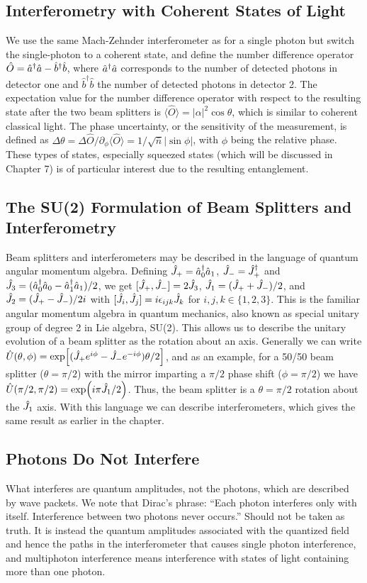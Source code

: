 \subsection{Interferometry with Coherent States of Light}
We use the same Mach-Zehnder interferometer as for a single photon but switch the single-photon to a coherent state, and define the number difference operator $\hat{O} = \hat{a}^\dagger \hat{a} - \hat{b}^\dagger \hat{b}$, where $\hat{a}^\dagger \hat{a}$ corresponds to the number of detected photons in detector one and $\hat{b}^\dagger \hat{b}$ the number of detected photons in detector 2. The expectation value for the number difference operator with respect to the resulting state after the two beam splitters is $\langle \hat{O} \rangle = |\alpha|^2\cos\theta$, which is similar to coherent classical light. The phase uncertainty, or the sensitivity of the measurement, is defined as $\Delta \theta = \Delta \hat{O} / \partial_\phi \langle\hat{O}\rangle = 1 /\sqrt{\bar{n}}|\sin\phi|$, with $\phi$ being the relative phase. These types of states, especially squeezed states (which will be discussed in Chapter 7) is of particular interest due to the resulting entanglement.

\subsection{The SU(2) Formulation of Beam Splitters and Interferometry}
Beam splitters and interferometers may be described in the language of quantum angular momentum algebra. Defining $\hat{J}_+ = \hat{a}^\dagger_0 \hat{a}_1$, $\hat{J}_- = \hat{J}^\dagger_+$ and $\hat{J}_3 = (\hat{a}^\dagger_0\hat{a}_0 - \hat{a}^\dagger_1\hat{a}_1)/2$, we get $[\hat{J}_+,\hat{J}_-] = 2\hat{J}_3$, $\hat{J}_1 = (\hat{J}_+ + \hat{J}_-)/2$, and $\hat{J}_2 = (\hat{J}_+ - \hat{J}_-)/2i$ with $[\J_i, \J_j] = i\epsilon_{ijk}\J_k$ for $i,j,k\in\{1,2,3\}$. This is the familiar angular momentum algebra in quantum mechanics, also known as special unitary group of degree 2 in Lie algebra, SU(2). This allows us to describe the unitary evolution of a beam splitter as the rotation about an axis. Generally we can write $\hat{U}(\theta, \phi) = \exp[(\J_+ e^{i\phi} - \J_- e^{-i\phi})\theta/2]$, and as an example, for a 50/50 beam splitter ($\theta = \pi/2$) with the mirror imparting a $\pi/2$ phase shift ($\phi=\pi/2$) we have $\hat{U}(\pi/2,\pi/2) = \exp(i\pi\hat{J}_1/2)$. Thus, the beam splitter is a $\theta = \pi/2$ rotation about the $\hat{J}_1$ axis. With this language we can describe interferometers, which gives the same result as earlier in the chapter. 

\subsection{Photons Do Not Interfere}
What interferes are quantum amplitudes, not the photons, which are described by wave packets. We note that Dirac's phrase: ``Each photon interferes only with itself. Interference between two photons never occurs.'' Should not be taken as truth. It is instead the quantum amplitudes associated with the quantized field and hence the paths in the interferometer that causes single photon interference, and multiphoton interference means interference with states of light containing more than one photon.

